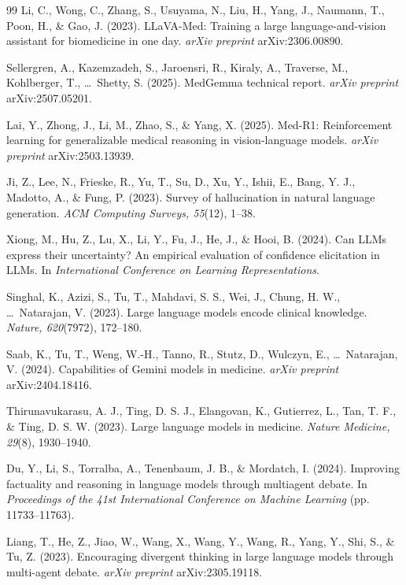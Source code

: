 \documentclass[12pt]{article}
\begin{document}
\begin{thebibliography}{99}
Li, C., Wong, C., Zhang, S., Usuyama, N., Liu, H., Yang, J., Naumann, T., Poon, H., \& Gao, J. (2023). LLaVA-Med: Training a large language-and-vision assistant for biomedicine in one day. \textit{arXiv preprint} arXiv:2306.00890.

Sellergren, A., Kazemzadeh, S., Jaroensri, R., Kiraly, A., Traverse, M., Kohlberger, T., \ldots\ Shetty, S. (2025). MedGemma technical report. \textit{arXiv preprint} arXiv:2507.05201.

Lai, Y., Zhong, J., Li, M., Zhao, S., \& Yang, X. (2025). Med-R1: Reinforcement learning for generalizable medical reasoning in vision-language models. \textit{arXiv preprint} arXiv:2503.13939.

Ji, Z., Lee, N., Frieske, R., Yu, T., Su, D., Xu, Y., Ishii, E., Bang, Y. J., Madotto, A., \& Fung, P. (2023). Survey of hallucination in natural language generation. \textit{ACM Computing Surveys, 55}(12), 1--38.

Xiong, M., Hu, Z., Lu, X., Li, Y., Fu, J., He, J., \& Hooi, B. (2024). Can LLMs express their uncertainty? An empirical evaluation of confidence elicitation in LLMs. In \textit{International Conference on Learning Representations}.

Singhal, K., Azizi, S., Tu, T., Mahdavi, S. S., Wei, J., Chung, H. W., \ldots\ Natarajan, V. (2023). Large language models encode clinical knowledge. \textit{Nature, 620}(7972), 172--180.

Saab, K., Tu, T., Weng, W.-H., Tanno, R., Stutz, D., Wulczyn, E., \ldots\ Natarajan, V. (2024). Capabilities of Gemini models in medicine. \textit{arXiv preprint} arXiv:2404.18416.

Thirunavukarasu, A. J., Ting, D. S. J., Elangovan, K., Gutierrez, L., Tan, T. F., \& Ting, D. S. W. (2023). Large language models in medicine. \textit{Nature Medicine, 29}(8), 1930--1940.

Du, Y., Li, S., Torralba, A., Tenenbaum, J. B., \& Mordatch, I. (2024). Improving factuality and reasoning in language models through multiagent debate. In \textit{Proceedings of the 41st International Conference on Machine Learning} (pp. 11733--11763).

Liang, T., He, Z., Jiao, W., Wang, X., Wang, Y., Wang, R., Yang, Y., Shi, S., \& Tu, Z. (2023). Encouraging divergent thinking in large language models through multi-agent debate. \textit{arXiv preprint} arXiv:2305.19118.


\end{thebibliography}
\end{document}
